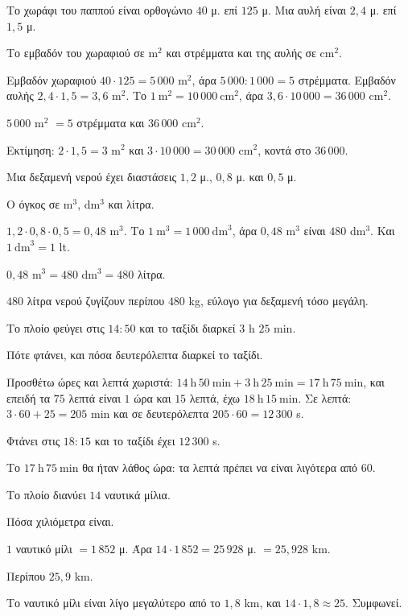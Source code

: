 \tixero Το χωράφι του παππού είναι ορθογώνιο $40$ μ. επί $125$ μ. Μια αυλή είναι $2{,}4$ μ. επί $1{,}5$ μ.\par
\tithelo Το εμβαδόν του χωραφιού σε m$^2$ και στρέμματα και της αυλής σε cm$^2$.\par
\possindeo Εμβαδόν χωραφιού $40\cdot125=5\,000$ m$^2$, άρα $5\,000:1\,000=5$ στρέμματα. Εμβαδόν αυλής $2{,}4\cdot1{,}5=3{,}6$ m$^2$. Το $1\ \mathrm{m}^2=10\,000\ \mathrm{cm}^2$, άρα $3{,}6\cdot10\,000=36\,000$ cm$^2$.\par
\apantisi $5\,000$ m$^2$ $=5$ στρέμματα και $36\,000$ cm$^2$.\par
\elegxos Εκτίμηση: $2\cdot1{,}5=3$ m$^2$ και $3\cdot10\,000=30\,000$ cm$^2$, κοντά στο $36\,000$.

\tixero Μια δεξαμενή νερού έχει διαστάσεις $1{,}2$ μ., $0{,}8$ μ. και $0{,}5$ μ.\par
\tithelo Ο όγκος σε m$^3$, dm$^3$ και λίτρα.\par
\possindeo $1{,}2\cdot0{,}8\cdot0{,}5=0{,}48$ m$^3$. Το $1\ \mathrm{m}^3=1\,000\ \mathrm{dm}^3$, άρα $0{,}48$ m$^3$ είναι $480$ dm$^3$. Και $1\ \mathrm{dm}^3=1$ lt.\par
\apantisi $0{,}48$ m$^3=480$ dm$^3=480$ λίτρα.\par
\elegxos $480$ λίτρα νερού ζυγίζουν περίπου $480$ kg, εύλογο για δεξαμενή τόσο μεγάλη.

\tixero Το πλοίο φεύγει στις $14{:}50$ και το ταξίδι διαρκεί $3$ h $25$ min.\par
\tithelo Πότε φτάνει, και πόσα δευτερόλεπτα διαρκεί το ταξίδι.\par
\possindeo Προσθέτω ώρες και λεπτά χωριστά: $14\ \mathrm{h}\,50\ \mathrm{min}+3\ \mathrm{h}\,25\ \mathrm{min}=17\ \mathrm{h}\,75\ \mathrm{min}$, και επειδή τα $75$ λεπτά είναι $1$ ώρα και $15$ λεπτά, έχω $18\ \mathrm{h}\,15\ \mathrm{min}$. Σε λεπτά: $3\cdot60+25=205$ min και σε δευτερόλεπτα $205\cdot60=12\,300$ s.\par
\apantisi Φτάνει στις $18{:}15$ και το ταξίδι έχει $12\,300$ s.\par
\elegxos Το $17\ \mathrm{h}\,75\ \mathrm{min}$ θα ήταν λάθος ώρα: τα λεπτά πρέπει να είναι λιγότερα από $60$.

\tixero Το πλοίο διανύει $14$ ναυτικά μίλια.\par
\tithelo Πόσα χιλιόμετρα είναι.\par
\possindeo $1$ ναυτικό μίλι $=1\,852$ μ. Άρα $14\cdot1\,852=25\,928$ μ. $=25{,}928$ km.\par
\apantisi Περίπου $25{,}9$ km.\par
\elegxos Το ναυτικό μίλι είναι λίγο μεγαλύτερο από το $1{,}8$ km, και $14\cdot1{,}8\approx25$. Συμφωνεί.

